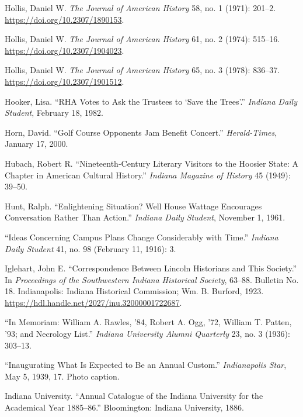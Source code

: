 \documentclass[
  american,
  letterpaper,
]{scrreprt}
\newlength{\cslhangindent}
\newenvironment{CSLReferences}[2] %
 {\begin{list}{}{%
  \setlength{\itemindent}{0pt}
  \setlength{\leftmargin}{0pt}
  \setlength{\parsep}{0pt}
  \ifodd #1
   \setlength{\leftmargin}{\cslhangindent}
   \setlength{\itemindent}{-1\cslhangindent}
  \fi
  \setlength{\itemsep}{#2\baselineskip}}}
 {\end{list}}
\begin{document}
\begin{CSLReferences}{1}{0}
Hollis, Daniel W. \emph{The Journal of American History} 58, no. 1
(1971): 201--2. \url{https://doi.org/10.2307/1890153}.

Hollis, Daniel W. \emph{The Journal of American History} 61, no. 2
(1974): 515--16. \url{https://doi.org/10.2307/1904023}.

Hollis, Daniel W. \emph{The Journal of American History} 65, no. 3
(1978): 836--37. \url{https://doi.org/10.2307/1901512}.

Hooker, Lisa. {``{RHA Votes to Ask the Trustees to {`Save the
Trees'}}.''} \emph{Indiana Daily Student}, February 18, 1982.

Horn, David. {``Golf Course Opponents Jam Benefit Concert.''}
\emph{Herald-Times}, January 17, 2000.

Hubach, Robert R. {``Nineteenth-Century Literary Visitors to the Hoosier
State: A Chapter in American Cultural History.''} \emph{Indiana Magazine
of History} 45 (1949): 39--50.

Hunt, Ralph. {``Enlightening Situation? Well House Wattage Encourages
Conversation Rather Than Action.''} \emph{Indiana Daily Student},
November 1, 1961.

{``Ideas Concerning Campus Plans Change Considerably with Time.''}
\emph{Indiana Daily Student} 41, no. 98 (February 11, 1916): 3.

Iglehart, John E. {``Correspondence Between Lincoln Historians and This
Society.''} In \emph{Proceedings of the Southwestern Indiana Historical
Society}, 63--88. Bulletin No. 18. Indianapolis: Indiana Historical
Commission; Wm. B. Burford, 1923.
\url{https://hdl.handle.net/2027/inu.32000001722687}.

{``{In Memoriam: William A. Rawles, '84, Robert A. Ogg, '72, William T.
Patten, '93; and Necrology List}.''} \emph{Indiana University Alumni
Quarterly} 23, no. 3 (1936): 303--13.

{``Inaugurating What Is Expected to Be an Annual Custom.''}
\emph{Indianapolis Star}, May 5, 1939, 17. Photo caption.

Indiana University. {``Annual Catalogue of the Indiana University for
the Academical Year 1885--86.''} Bloomington: Indiana University, 1886.


\end{CSLReferences}
\end{document}
